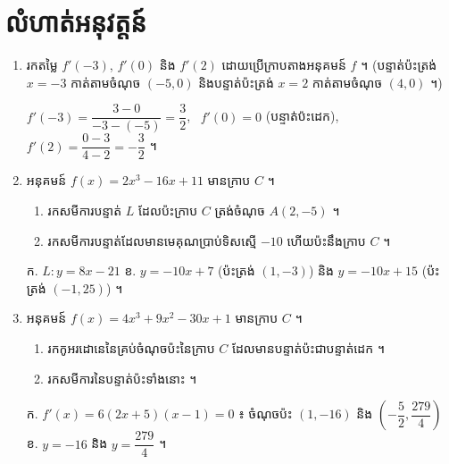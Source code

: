 \section*{លំហាត់អនុវត្តន៍}
\begin{enumerate}[1]
  \item រកតម្លៃ $f'(-3)$, $f'(0)$ និង $f'(2)$ ដោយប្រើក្រាបតាងអនុគមន៍ $f$ ។ (បន្ទាត់ប៉ះត្រង់ $x = -3$ កាត់តាមចំណុច $(-5, 0)$ និងបន្ទាត់ប៉ះត្រង់ $x = 2$ កាត់តាមចំណុច $(4, 0)$ ។)

  \begin{center}
  \end{center}
  \ans
  $f'(-3) = \dfrac{3 - 0}{-3 - (-5)} = \dfrac{3}{2}$, \ $f'(0) = 0$ (បន្ទាត់ប៉ះដេក), \ $f'(2) = \dfrac{0 - 3}{4 - 2} = -\dfrac{3}{2}$ ។
  \item អនុគមន៍ $f(x) = 2x^3 - 16x + 11$ មានក្រាប $C$ ។
  \begin{enumerate}[a]
    \item រកសមីការបន្ទាត់ $L$ ដែលប៉ះក្រាប $C$ ត្រង់ចំណុច $A(2, -5)$ ។
    \item រកសមីការបន្ទាត់ដែលមានមេគុណប្រាប់ទិសស្មើ $-10$ ហើយប៉ះនឹងក្រាប $C$ ។
  \end{enumerate}
  \ans
  ក. $L : y = 8x - 21$ \quad ខ. $y = -10x + 7$ (ប៉ះត្រង់ $(1, -3)$) និង $y = -10x + 15$ (ប៉ះត្រង់ $(-1, 25)$) ។
  \item អនុគមន៍ $f(x) = 4x^3 + 9x^2 - 30x + 1$ មានក្រាប $C$ ។
  \begin{enumerate}[a]
    \item រកកូអរដោនេនៃគ្រប់ចំណុចប៉ះនៃក្រាប $C$ ដែលមានបន្ទាត់ប៉ះជាបន្ទាត់ដេក ។
    \item រកសមីការនៃបន្ទាត់ប៉ះទាំងនោះ ។
  \end{enumerate}
  \ans
  ក. $f'(x) = 6(2x + 5)(x - 1) = 0$ ៖ ចំណុចប៉ះ $(1, -16)$ និង $\left(-\dfrac{5}{2}, \dfrac{279}{4}\right)$ \quad ខ. $y = -16$ និង $y = \dfrac{279}{4}$ ។

\end{enumerate}
